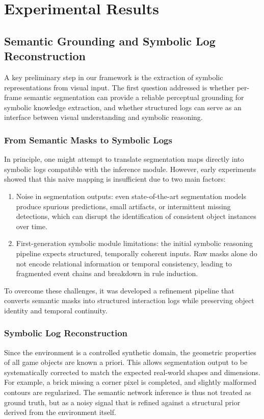 \documentclass[12pt,a4paper]{report}
\begin{document}
\section{Experimental Results}
\subsection{Semantic Grounding and Symbolic Log Reconstruction}
A key preliminary step in our framework is the extraction of symbolic representations from visual input. The first question addressed is whether per-frame semantic segmentation can provide a reliable perceptual grounding for symbolic knowledge extraction, and whether structured logs can serve as an interface between visual understanding and symbolic reasoning.

\subsubsection{From Semantic Masks to Symbolic Logs}
In principle, one might attempt to translate segmentation maps directly into symbolic logs compatible with the inference module. However, early experiments showed that this naive mapping is insufficient due to two main factors:
\begin{enumerate}
    \item Noise in segmentation outputs: even state-of-the-art segmentation models produce spurious predictions, small artifacts, or intermittent missing detections, which can disrupt the identification of consistent object instances over time.
    \item First-generation symbolic module limitations: the initial symbolic reasoning pipeline expects structured, temporally coherent inputs. Raw masks alone do not encode relational information or temporal consistency, leading to fragmented event chains and breakdown in rule induction.
\end{enumerate}
To overcome these challenges, it was developed a refinement pipeline that converts semantic masks into structured interaction logs while preserving object identity and temporal continuity.

\subsubsection{Symbolic Log Reconstruction}
Since the environment is a controlled synthetic domain, the geometric properties of all game objects are known a priori. This allows segmentation output to be systematically corrected to match the expected real-world shapes and dimensions. For example, a brick missing a corner pixel is completed, and slightly malformed contours are regularized. The semantic network inference is thus not treated as ground truth, but as a noisy signal that is refined against a structural prior derived from the environment itself.
\end{document}
